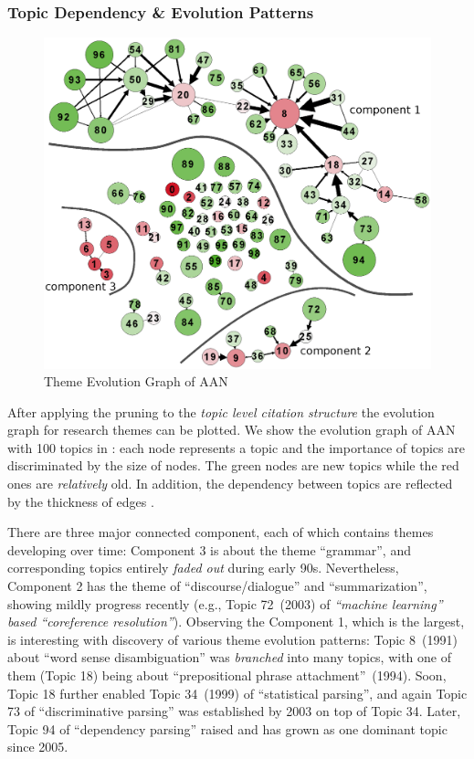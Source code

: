 \subsubsection{Topic Dependency \& Evolution Patterns}

\begin{figure}[h!]
  \begin{center}
  \includegraphics[scale=.7]{citation-lda/plot/full_color_with_labels}
  \caption{Theme Evolution Graph of AAN}
  \label{fig:full}
  \end{center}
\end{figure}

After applying the pruning to the \emph{topic level citation structure} the
evolution graph for research themes can be plotted.  We show the evolution graph
of AAN with 100 topics in : each node represents a topic
and the importance of topics are discriminated by the size of nodes. The green
nodes are new topics while the red ones are \emph{relatively} old. In addition,
the dependency between topics are reflected by the thickness of edges .

There are three major connected component, each of which contains themes
developing over time: Component 3 is about the theme ``grammar'', and
corresponding topics entirely \emph{faded out} during early 90s. Nevertheless,
Component 2 has the theme of ``discourse/dialogue'' and ``summarization'',
showing mildly progress recently (e.g., Topic 72~(2003) of \emph{``machine
learning'' based ``coreference resolution''}).  Observing the Component 1, which
is the largest, is interesting with discovery of various theme evolution
patterns: Topic 8~(1991) about ``word sense disambiguation'' was \emph{branched}
into many topics, with one of them (Topic 18) being about ``prepositional phrase
attachment''~(1994).  Soon, Topic 18 further enabled Topic 34~(1999) of
``statistical parsing'', and again Topic 73 of ``discriminative parsing'' was
established by 2003 on top of Topic 34. Later, Topic 94 of ``dependency
parsing'' raised and has grown as one dominant topic since 2005.

